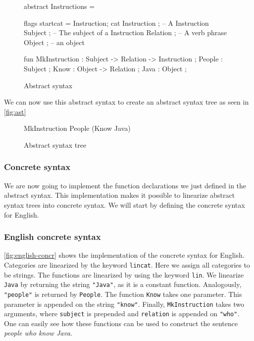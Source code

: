 \begin{figure}[h]
\begin{code}
abstract Instructions = { 
  flags startcat = Instruction; 
  cat
    Instruction ; -- A Instruction
    Subject ;  -- The subject of a Instruction
    Relation ; -- A verb phrase
    Object ;   -- an object

  fun		 	  
    MkInstruction : Subject -> Relation -> Instruction ;
    People : Subject ;
    Know : Object -> Relation ;
    Java : Object ; 
}
\end{code}
\caption{Abstract syntax\label{fig:abstract-syntax}}
\end{figure}

We can now use this abstract syntax to create an abstract syntax tree as seen in \autoref{fig:ast}

\begin{figure}[h]
\begin{plaintext}
MkInstruction People (Know Java)
\end{plaintext}
\caption{Abstract syntax tree\label{fig:ast}}
\end{figure}

\subsubsection*{Concrete syntax}

We are now going to implement the function declarations we just defined in the abstract syntax. This implementation makes it possible to linearize abstract syntax trees into concrete syntax. We will start by defining the concrete syntax for English.

\subsubsection*{English concrete syntax}

\autoref{fig:english-concr} shows the implementation of the concrete syntax for English. Categories are linearized by the keyword \texttt{lincat}. Here we assign all categories to be strings. The functions are linearized by using the keyword \texttt{lin}. We linearize \texttt{Java} by returning the string \texttt{"Java"}, as it is a constant function. Analogously, \texttt{"people"} is returned by \texttt{People}. The function \texttt{Know} takes one parameter. This parameter is appended on the string \texttt{"know"}. Finally, \texttt{MkInstruction} takes two arguments, where \texttt{subject} is prepended and \texttt{relation} is appended on \texttt{"who"}. One can easily see how these functions can be used to construct the sentence \emph{people who know Java}.


